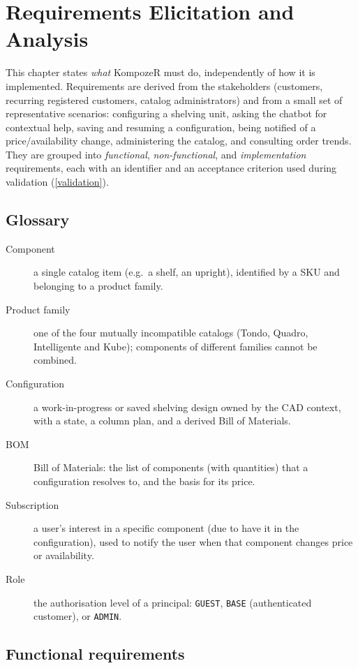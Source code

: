 \section{Requirements Elicitation and Analysis}\label{requirements}

This chapter states \emph{what} KompozeR must do, independently of how it is
implemented. Requirements are derived from the stakeholders (customers,
recurring registered customers, catalog administrators) and from a small set of
representative scenarios: configuring a shelving unit, asking the chatbot for
contextual help, saving and resuming a configuration, being notified of a
price/availability change, administering the catalog, and consulting order
trends. They are grouped into \emph{functional}, \emph{non-functional}, and
\emph{implementation} requirements, each with an identifier and an acceptance
criterion used during validation (\cref{validation}).

\subsection{Glossary}\label{glossary}

\begin{description}
  \item[Component] a single catalog item (e.g.~a shelf, an upright), identified
  by a SKU and belonging to a product family.
  \item[Product family] one of the four mutually incompatible catalogs
  (Tondo, Quadro, Intelligente and Kube); components of different families cannot be combined.
  \item[Configuration] a work-in-progress or saved shelving design owned by the
  CAD context, with a state, a column plan, and a derived Bill of Materials.
  \item[BOM] Bill of Materials: the list of components (with quantities) that a
  configuration resolves to, and the basis for its price.
  \item[Subscription] a user's interest in a specific component (due to have it in the configuration), used to notify the
  user when that component changes price or availability.
  \item[Role] the authorisation level of a principal: \texttt{GUEST},
  \texttt{BASE} (authenticated customer), or \texttt{ADMIN}.
\end{description}

\subsection{Functional requirements}\label{functional-requirements}

